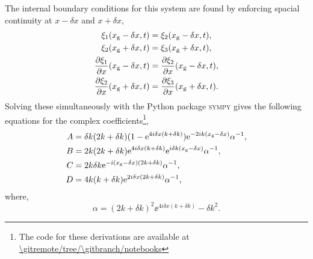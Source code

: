 The internal boundary conditions for this system are found by enforcing spacial continuity at \(x - \delta x\) and \(x + \delta x\),
%
\begin{align*}
    \xi_1(x_{{\mathrm{g}}} - \delta x, t) &= \xi_2(x_{{\mathrm{g}}} - \delta x, t), \\
    \xi_2(x_{{\mathrm{g}}} + \delta x, t) &= \xi_3(x_{{\mathrm{g}}} + \delta x, t), \\
    \frac{\partial \xi_1}{\partial x}(x_{{\mathrm{g}}} - \delta x, t) &= \frac{\partial \xi_2}{\partial x}(x_{{\mathrm{g}}} - \delta x, t), \\
    \frac{\partial \xi_2}{\partial x}(x_{{\mathrm{g}}} + \delta x, t) &= \frac{\partial \xi_3}{\partial x}(x_{{\mathrm{g}}} + \delta x, t).
\end{align*}
%
Solving these simultaneously with the Python package \textsc{sympy} gives the following equations for the complex coefficients\footnote{The code for these derivations are available at \url{\gitremote/tree/\gitbranch/notebooks}},
%
\begin{align}
    A &= \delta k (2k + \delta k) (1 - \mathrm{e}^{4i \delta x (k + \delta k)}) \mathrm{e}^{- 2i k (x_{{\mathrm{g}}} - \delta x)} \alpha^{-1}, \\
    B &= 2 k (2k + \delta k) \mathrm{e}^{4i \delta x (k + \delta k)} \mathrm{e}^{i \delta k (x_{{\mathrm{g}}} - \delta x)} \alpha^{-1}, \\
    C &= 2 k \delta k \mathrm{e}^{- i (x_{{\mathrm{g}}} - \delta x) (2k + \delta k)} \alpha^{-1}, \\
    D &= 4 k (k + \delta k) \mathrm{e}^{2 i \delta x (2k + \delta k)} \alpha^{-1},
\end{align}
%
where,
\begin{equation}
    \alpha = (2k + \delta k)^2 \ee^{4 i \delta x (k + \delta k)} - \delta k^2.
\end{equation}
%

